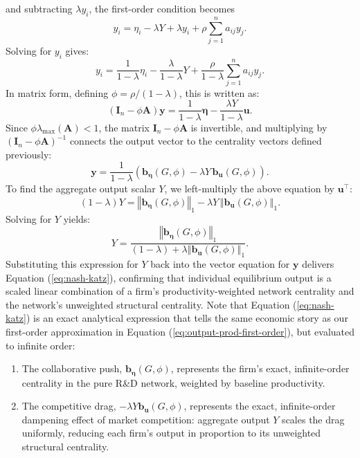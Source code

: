 and subtracting $\lambda y_i$, the first-order condition becomes
\[
y_{i} = \eta_{i} - \lambda Y + \lambda y_{i} + \rho \sum_{j=1}^{n}a_{ij}y_{j}.
\]
Solving for $y_i$ gives:
\[
y_{i} = \frac{1}{1-\lambda }\eta_{i} - \frac{\lambda }{1-\lambda }Y + \frac{\rho }{1-\lambda } \sum_{j=1}^{n}a_{ij}y_{j}.
\]
In matrix form, defining $\phi = \rho / (1-\lambda)$, this is written as:
\[
\left( \mathbf{I}_n - \phi \mathbf{A}\right) \mathbf{y} = \frac{1}{1-\lambda} \boldsymbol{\eta} - \frac{\lambda Y}{1-\lambda }\mathbf{u}.
\]
Since $\phi\lambda_{\max}(\mathbf A)<1$, the matrix $\mathbf I_n-\phi\mathbf A$
is invertible, and multiplying by $(\mathbf{I}_n - \phi\mathbf{A})^{-1}$
connects the output vector to the centrality vectors defined previously:
\[
\mathbf{y} = \frac{1}{1-\lambda }\left( \mathbf{b}_{\boldsymbol{\eta}}(G,\phi ) - \lambda Y\,\mathbf{b}_{\mathbf{u}}(G,\phi )\right).
\]
To find the aggregate output scalar $Y$, we left-multiply the above equation by
$\mathbf{u}^\top$:
\[
(1-\lambda) Y = \left\Vert \mathbf{b}_{\boldsymbol{\eta}}(G,\phi )\right\Vert_{1} - \lambda Y\,\left\Vert \mathbf{b}_{\mathbf{u}}(G,\phi )\right\Vert_{1}.
\]
Solving for $Y$ yields:
\[
Y = \frac{\left\Vert \mathbf{b}_{\boldsymbol{\eta}}(G,\phi) \right\Vert_1}{(1 - \lambda) + \lambda \left\Vert \mathbf{b}_{\mathbf{u}}(G,\phi) \right\Vert_1}.
\]
Substituting this expression for $Y$ back into the vector equation for
$\mathbf{y}$ delivers Equation (\ref{eq:nash-katz}), confirming that individual
equilibrium output is a scaled linear combination of a firm's
productivity-weighted network centrality and the network's unweighted
structural centrality. Note that Equation (\ref{eq:nash-katz}) is an exact
analytical expression that tells the same economic story as our first-order
approximation in Equation (\ref{eq:output-prod-first-order}), but evaluated to
infinite order:
\begin{enumerate}
    \item The collaborative push, $\mathbf{b}_{\boldsymbol{\eta}}(G, \phi)$,
    represents the firm's exact, infinite-order centrality in the pure R\&D
    network, weighted by baseline productivity.
    \item The competitive drag, $-\lambda Y\mathbf{b}_{\mathbf{u}}(G, \phi)$,
    represents the exact, infinite-order dampening effect of market
    competition: aggregate output $Y$ scales the drag uniformly, reducing each
    firm's output in proportion to its unweighted structural centrality.
\end{enumerate}

